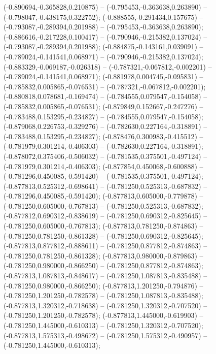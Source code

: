  (-0.890694,-0.365828,0.210875) -- (-0.795453,-0.363638,0.263890) -- (-0.798047,-0.438175,0.322752);
 (-0.888555,-0.291434,0.157675) -- (-0.793087,-0.289394,0.201988) -- (-0.795453,-0.363638,0.263890);
 (-0.886616,-0.217228,0.100417) -- (-0.790946,-0.215382,0.137024) -- (-0.793087,-0.289394,0.201988);
 (-0.884875,-0.143161,0.039091) -- (-0.789024,-0.141541,0.068971) -- (-0.790946,-0.215382,0.137024);
 (-0.883329,-0.069187,-0.026318) -- (-0.787321,-0.067812,-0.002201) -- (-0.789024,-0.141541,0.068971);
 (-0.881978,0.004745,-0.095831) -- (-0.785832,0.005865,-0.076531) -- (-0.787321,-0.067812,-0.002201);
 (-0.880818,0.078681,-0.169474) -- (-0.784555,0.079547,-0.154058) -- (-0.785832,0.005865,-0.076531);
 (-0.879849,0.152667,-0.247276) -- (-0.783488,0.153295,-0.234827) -- (-0.784555,0.079547,-0.154058);
 (-0.879068,0.226753,-0.329276) -- (-0.782630,0.227164,-0.318891) -- (-0.783488,0.153295,-0.234827);
 (-0.878476,0.300983,-0.415512) -- (-0.781979,0.301214,-0.406303) -- (-0.782630,0.227164,-0.318891);
 (-0.878072,0.375406,-0.506032) -- (-0.781535,0.375501,-0.497124) -- (-0.781979,0.301214,-0.406303);
 (-0.877854,0.450068,-0.600888) -- (-0.781296,0.450085,-0.591420) -- (-0.781535,0.375501,-0.497124);
 (-0.877813,0.525312,-0.698641) -- (-0.781250,0.525313,-0.687832) -- (-0.781296,0.450085,-0.591420);
 (-0.877813,0.605000,-0.779878) -- (-0.781250,0.605000,-0.767813) -- (-0.781250,0.525313,-0.687832);
 (-0.877812,0.690312,-0.838619) -- (-0.781250,0.690312,-0.825645) -- (-0.781250,0.605000,-0.767813);
 (-0.877813,0.781250,-0.874863) -- (-0.781250,0.781250,-0.861328) -- (-0.781250,0.690312,-0.825645);
 (-0.877813,0.877812,-0.888611) -- (-0.781250,0.877812,-0.874863) -- (-0.781250,0.781250,-0.861328);
 (-0.877813,0.980000,-0.879863) -- (-0.781250,0.980000,-0.866250) -- (-0.781250,0.877812,-0.874863);
 (-0.877813,1.087813,-0.848617) -- (-0.781250,1.087813,-0.835488) -- (-0.781250,0.980000,-0.866250);
 (-0.877813,1.201250,-0.794876) -- (-0.781250,1.201250,-0.782578) -- (-0.781250,1.087813,-0.835488);
 (-0.877813,1.320312,-0.718638) -- (-0.781250,1.320312,-0.707520) -- (-0.781250,1.201250,-0.782578);
 (-0.877813,1.445000,-0.619903) -- (-0.781250,1.445000,-0.610313) -- (-0.781250,1.320312,-0.707520);
 (-0.877813,1.575313,-0.498672) -- (-0.781250,1.575312,-0.490957) -- (-0.781250,1.445000,-0.610313);
